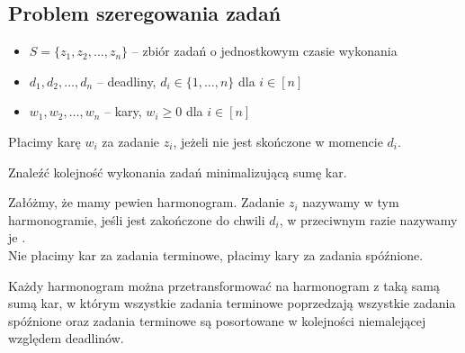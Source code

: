\subsection{Problem szeregowania zadań}

\begin{itemize}[nosep]
	\item $S = \{z_1, z_2, \ldots, z_n\}$ -- zbiór zadań o jednostkowym czasie wykonania
	\item $d_1, d_2, \ldots, d_n$ -- deadliny, $d_i \in \{1, \ldots, n\}$ dla $i \in [n]$
	\item $w_1, w_2, \ldots, w_n$ -- kary, $w_i \geq 0$ dla $i \in [n]$
\end{itemize}
Płacimy karę $w_i$ za zadanie $z_i$, jeżeli nie jest skończone w momencie $d_i$.\\
\begin{problem}
	Znaleźć kolejność wykonania zadań minimalizującą sumę kar.
\end{problem}

Załóżmy, że mamy pewien harmonogram. Zadanie $z_i$ nazywamy  w tym harmonogramie, jeśli jest zakończone do chwili $d_i$, w przeciwnym razie nazywamy je .\\
Nie płacimy kar za zadania terminowe, płacimy kary za zadania spóźnione.

\begin{lemma}
	Każdy harmonogram można przetransformować na harmonogram z taką samą sumą kar, w którym wszystkie zadania terminowe poprzedzają wszystkie zadania spóźnione oraz zadania terminowe są posortowane w kolejności niemalejącej względem deadlinów.
\end{lemma}
